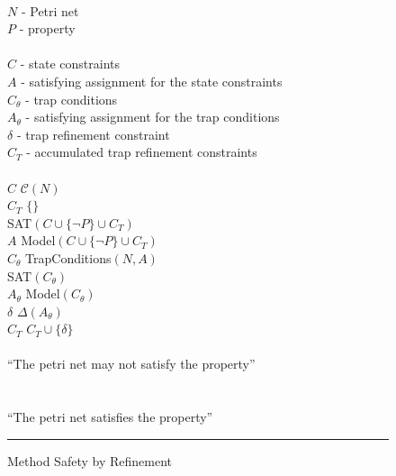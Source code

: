 \begin{figure}
\begin{minipage}[t]{.94\columnwidth}
    \algInput\\
    \tabT $N$ - Petri net \\
    \tabT $P$ - property \\
    \algVars\\
    \tabT $C$ - state constraints \\
    \tabT $A$ - satisfying assignment for the state constraints \\
    \tabT $C_\theta$ - trap conditions \\
    \tabT $A_\theta$ - satisfying assignment for the trap conditions \\
    \tabT $\delta$ - trap refinement constraint \\
    \tabT $C_T$ - accumulated trap refinement constraints \\
    \algBegin\\
    \tabT $C$ \algAssgn $\mathcal C(N)$ \\
    \tabT $C_T$ \algAssgn $\{\}$ \\
    \tabT \algWhile SAT$(C \cup \{\neg P\} \cup C_T)$ \algDo \\
    \tabTT $A$ \algAssgn Model$(C \cup \{\neg P\} \cup C_T)$ \\
    \tabTT $C_\theta$ \algAssgn TrapConditions$(N, A)$ \\
    \tabTT \algIf SAT$(C_\theta)$ \algThen \\
    \tabTTT $A_\theta$ \algAssgn Model$(C_\theta)$ \\
    \tabTTT $\delta$ \algAssgn $\Delta(A_\theta)$ \\
    \tabTTT $C_T$ \algAssgn $C_T \cup \{\delta\}$ \\
    \tabTT \algElse \\
    \tabTTT \algReturn ``The petri net may not satisfy the property'' \\
    \tabTT \algFi \\
    \tabT \algOd \\
    \tabT \algReturn ``The petri net satisfies the property'' \\
    \algEnd
  \end{minipage}
  \vspace{1.5ex}
  \hrule
  \caption{Method Safety by Refinement}
  \label{fig_method_safety_by_refinement}
\end{figure}

